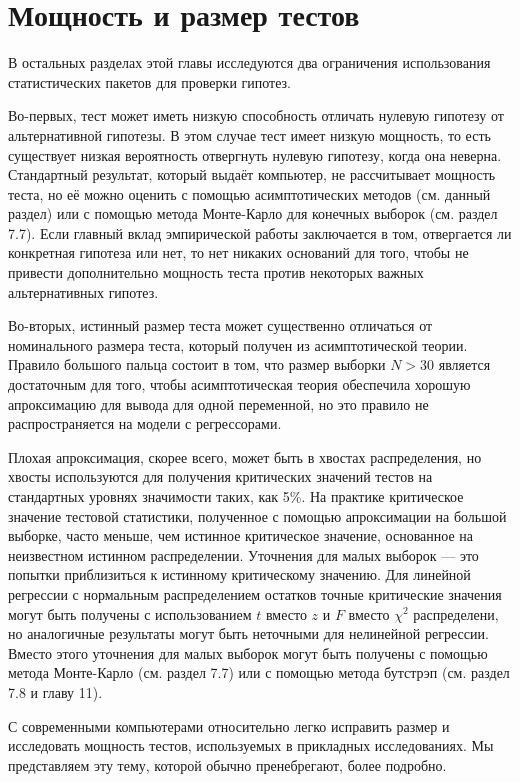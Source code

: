 \section{Мощность и размер тестов}

В остальных разделах этой главы исследуются два ограничения использования статистических пакетов для проверки гипотез.

Во-первых, тест может иметь низкую способность отличать нулевую гипотезу от альтернативной гипотезы. В этом случае тест имеет низкую мощность, то есть существует низкая вероятность отвергнуть нулевую гипотезу, когда она неверна. Стандартный результат, который выдаёт компьютер, не рассчитывает мощность теста, но её можно оценить с помощью асимптотических методов (см. данный раздел) или с помощью метода Монте-Карло для конечных выборок (см. раздел 7.7). Если главный вклад эмпирической работы заключается в том, отвергается ли конкретная гипотеза или нет, то нет никаких оснований для того, чтобы не привести дополнительно мощность теста против некоторых важных альтернативных гипотез.

Во-вторых, истинный размер теста может существенно отличаться от номинального размера теста, который получен из асимптотической теории. Правило большого пальца состоит в том, что размер выборки $N > 30$ является достаточным для того, чтобы асимптотическая теория обеспечила хорошую апроксимацию для вывода для одной переменной, но это правило не распространяется на модели с регрессорами. 

Плохая апроксимация, скорее всего, может быть в хвостах распределения, но хвосты используются для получения критических значений тестов на стандартных уровнях значимости таких, как 5\%. На практике критическое значение тестовой статистики, полученное с помощью апроксимации на большой выборке, часто меньше, чем истинное критическое значение, основанное на неизвестном истинном распределении. Уточнения для малых выборок --- это попытки приблизиться к истинному критическому значению. Для линейной регрессии с нормальным распределением остатков точные критические значения могут быть получены с использованием $t$ вместо $z$ и $F$ вместо $\chi^2$ распределени, но аналогичные результаты могут быть неточными для нелинейной регрессии. Вместо этого уточнения для малых выборок могут быть получены с помощью метода Монте-Карло (см. раздел 7.7) или с помощью метода бутстрэп (см. раздел 7.8 и главу 11).

С современными компьютерами относительно легко исправить размер и исследовать мощность тестов, используемых в прикладных исследованиях. Мы представляем эту тему, которой обычно пренебрегают, более подробно.

